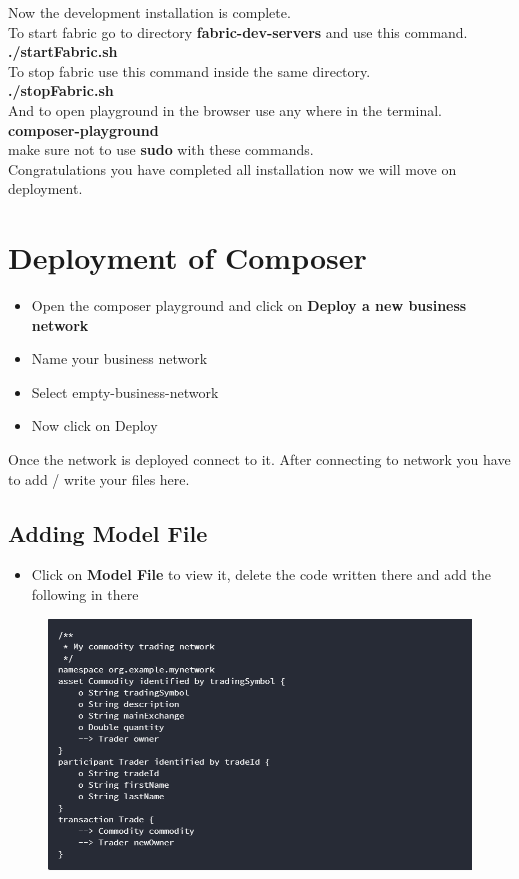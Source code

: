 Now the development installation is complete. \\To start fabric go to directory \textbf{fabric-dev-servers} and use this command.\\
\textbf{./startFabric.sh}
\\To stop fabric use this command inside the same directory.\\
\textbf{./stopFabric.sh}
\\And to open playground in the browser use any where in the terminal. \\
\textbf{composer-playground}
\\make sure not to use \textbf{sudo} with these commands.
\\Congratulations you have completed all installation now we will move on deployment.

\section{Deployment of Composer}
\begin{itemize}
	\item Open the composer playground and click on \textbf{Deploy a new business network}
	\item Name your business network 
	\item Select empty-business-network
	\item Now click on Deploy
\end{itemize}
Once the network is deployed connect to it. After connecting to network you have to add / write your files here.
\subsection{Adding Model File}
\begin{itemize}
	\item Click on \textbf{Model File} to view it, delete the code written there and add the following in there
\end{itemize}
\begin{figure}[h]
	\centering
	\includegraphics[width=450px]{figures/installation/10.png}
\end{figure}
\newpage
